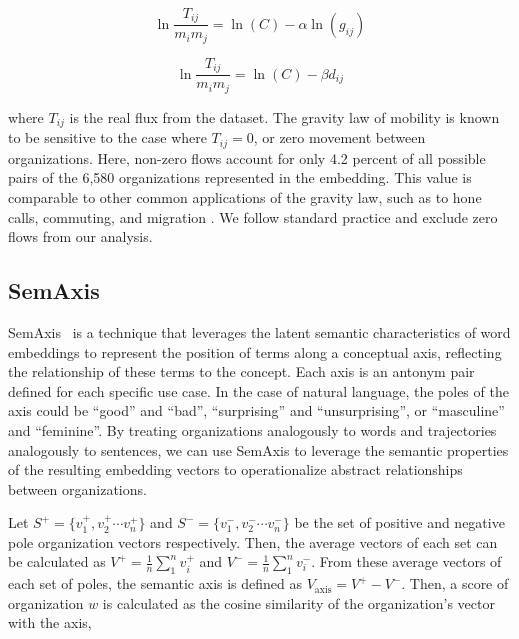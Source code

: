 \documentclass[12pt]{article} %
\begin{document}
\begin{equation}
	\label{eq:linear_flux_geo}
	\ln\frac{T_{ij}}{m_im_j} = \ln(C)  - \alpha \ln(g_{ij})
\end{equation}

\begin{equation}
	\label{eq:linear_flux_emb}
	\ln\frac{T_{ij}}{m_im_j} = \ln(C) - \beta d_{ij}
\end{equation}

where $T_{ij}$ is the real flux from the dataset. The gravity law of mobility is known to be sensitive to the case where $T_{ij} = 0$, or zero movement between organizations.
Here, non-zero flows account for only 4.2 percent of all possible pairs of the 6,580 organizations represented in the embedding.
This value is comparable to other common applications of the gravity law, such as to hone calls, commuting, and migration \autocite{simini2012universal}.
We follow standard practice and exclude zero flows from our analysis.



%
%
\subsection*{SemAxis}
SemAxis~\autocite{an2018semaxis} is a technique that leverages the latent semantic characteristics of word embeddings to represent the position of terms along a conceptual axis, reflecting the relationship of these terms to the concept.
Each axis is an antonym pair defined for each specific use case.
In the case of natural language, the poles of the axis could be ``good'' and ``bad'', ``surprising'' and ``unsurprising'', or ``masculine'' and ``feminine''. 
By treating organizations analogously to words and trajectories analogously to sentences, we can use SemAxis to leverage the semantic properties of the resulting embedding vectors to operationalize abstract relationships between organizations. 

Let $S^+ = \{v_1^+, v_2^+ \cdots v_n^+\}$ and $S^- =\{v_1^-, v_2^- \cdots v_n^-\}$ be the set of positive and negative pole organization vectors respectively. Then, the average vectors of each set can be calculated as $V^{+} = \frac{1}{n}\sum^n_1 v_i^+$ and $V^{-} = \frac{1}{n}\sum^n_1 v_i^-$. From these average vectors of each set of poles, the semantic axis is defined as $V_{\text{axis}} = V^{+} - V^{-}$. Then,  a score of organization $w$ is calculated as the cosine similarity of the organization's vector with the axis, 
\end{document}
